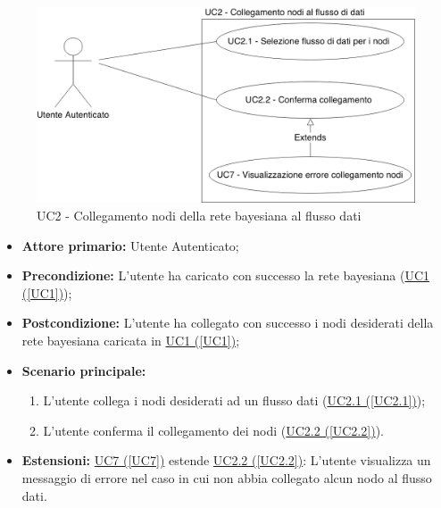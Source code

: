 \begin{figure}[H]
\centering
\includegraphics[scale=0.3]{./images/UC2.png}
\caption{UC2 - Collegamento nodi della rete bayesiana al flusso dati}
\end{figure}

\begin{itemize}
\item \textbf{Attore primario:} Utente Autenticato;
\item \textbf{Precondizione:} L'utente ha caricato con successo la rete bayesiana (\hyperref[UC1]{UC1 (\ref*{UC1})});
\item \textbf{Postcondizione:} L'utente ha collegato con successo i nodi desiderati della rete bayesiana caricata in \hyperref[UC1]{UC1 (\ref*{UC1})};
\item \textbf{Scenario principale:}
	\begin{enumerate}
	\item L'utente collega i nodi desiderati ad un flusso dati (\hyperref[UC2.1]{UC2.1 (\ref*{UC2.1})});
	\item L'utente conferma il collegamento dei nodi (\hyperref[2.2]{UC2.2 (\ref*{UC2.2})}).
	\end{enumerate}
\item \textbf{Estensioni:} \hyperref[UC7]{UC7 (\ref*{UC7})} estende \hyperref[UC2.2]{UC2.2 (\ref*{UC2.2})}: L'utente visualizza un messaggio di errore nel caso in cui non abbia collegato alcun nodo al flusso dati.
\end{itemize}

